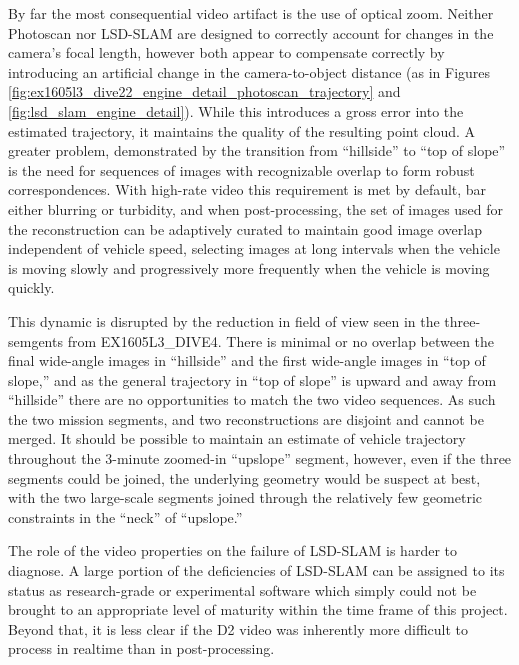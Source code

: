 \documentclass[letterpaper,12pt]{article}
\begin{document}
By far the most consequential video artifact is the use of optical zoom.   Neither Photoscan nor LSD-SLAM are designed to correctly account for changes in the camera's focal length, however both appear to compensate correctly by introducing an artificial change in the camera-to-object distance (as in Figures \ref{fig:ex1605l3_dive22_engine_detail_photoscan_trajectory} and \ref{fig:lsd_slam_engine_detail}).   While this introduces a gross error into the estimated trajectory, it maintains the quality of the resulting point cloud.    A greater problem, demonstrated by the transition from ``hillside'' to ``top of slope'' is the need for sequences of images with recognizable overlap to form robust correspondences.  With high-rate video this requirement is met by default, bar either blurring or turbidity, and when post-processing, the set of images used for the reconstruction can be adaptively curated to maintain good image overlap independent of vehicle speed, selecting images at long intervals when the vehicle is moving slowly and progressively more frequently when the vehicle is moving quickly.

This dynamic is disrupted by the reduction in field of view seen in the three-semgents from EX1605L3\_DIVE4.    There is minimal or no overlap between the final wide-angle images in ``hillside'' and the first wide-angle images in ``top of slope,'' and as the general trajectory in ``top of slope'' is upward and away from ``hillside'' there are no opportunities to match the two video sequences.   As such the two mission segments, and two reconstructions are disjoint and cannot be merged.    It should be possible to maintain an estimate of vehicle trajectory throughout the 3-minute zoomed-in ``upslope'' segment, however, even if the three segments could be joined, the underlying geometry would be suspect at best, with the two large-scale segments joined through the relatively few geometric constraints in the ``neck'' of ``upslope.'' 

The role of the video properties on the failure of LSD-SLAM is harder to diagnose.   A large portion of the deficiencies of LSD-SLAM can be assigned to its status as research-grade or experimental software which simply could not be brought to an appropriate level of maturity within the time frame of this project.    Beyond that, it is less clear if the D2 video was inherently more difficult to process in realtime than in post-processing.
\end{document}
